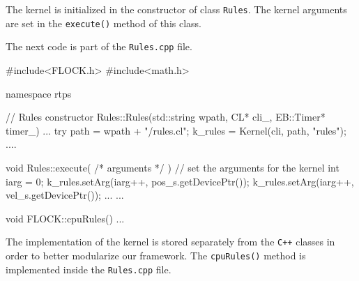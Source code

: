 The kernel is initialized in the constructor of class \texttt{Rules}. The kernel arguments are set in the \texttt{execute()} method of this class. 

The next code is part of the \texttt{Rules.cpp} file.

\begin{cppcode}{0}
#include<FLOCK.h>
#include<math.h>

namespace rtps
{
	// Rules constructor
	Rules::Rules(std::string wpath, CL* cli_, EB::Timer* timer_)
	{
		...
		try
		{
			path = wpath + "/rules.cl";
			k_rules = Kernel(cli, path, "rules");
		}
		....
	}

	void Rules::execute( /* arguments */ )
	{
		// set the arguments for the kernel
		int iarg = 0;
		k_rules.setArg(iarg++, pos_s.getDevicePtr());
		k_rules.setArg(iarg++, vel_s.getDevicePtr());
		...
	}
	...
	
	void FLOCK::cpuRules()
	{
		...
	}
}
\end{cppcode}

The implementation of the kernel is stored separately from the \texttt{C++} classes in order to better modularize our framework. The \texttt{cpuRules()} method is implemented inside the \texttt{Rules.cpp} file. 





